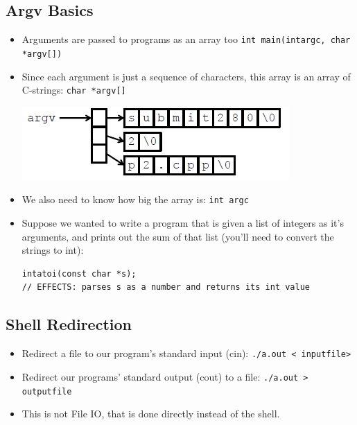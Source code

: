\subsection{Argv Basics}
\begin{itemize}
	\item Arguments are passed to programs as an array too \lstinline[style=C++]{int main(intargc, char *argv[])}
	\item Since each argument is just a sequence of characters, this array is an array of C-strings: \lstinline[style=C++]{char *argv[]}
	\begin{center}
		\includegraphics{sections/lec8/argv.png}
	\end{center}
	\item We also need to know how big the array is: \lstinline[style=C++]{int argc}
	\item Suppose we wanted to write a program that is given a list of integers as it’s arguments, and prints out the sum of that list (you'll need to convert the strings to int):
\begin{lstlisting}[style=C++]
intatoi(const char *s);
// EFFECTS: parses s as a number and returns its int value
\end{lstlisting}
\end{itemize}

\subsection{Shell Redirection}
\begin{itemize}
	\item Redirect a file to our program's standard input (cin): \lstinline[style=bash]{./a.out < inputfile>}
	\item Redirect our programs' standard output (cout) to a file: \lstinline[style=bash]{./a.out > outputfile}
	\item This is not File IO, that is done directly instead of the shell.
\end{itemize}

